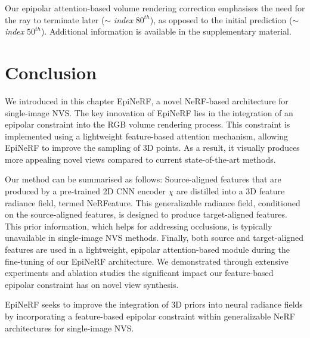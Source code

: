 Our epipolar attention-based volume rendering correction emphasises the need for the ray to terminate later ($\sim$ \textit{index} $80^{th}$), as opposed to the initial prediction ($\sim$ \textit{index} $50^{th}$). Additional information is available in the supplementary material.

\section{Conclusion}

We introduced in this chapter EpiNeRF, a novel \ac{NeRF}-based architecture for single-image \ac{NVS}. The key innovation of EpiNeRF lies in the integration of an epipolar constraint into the RGB volume rendering process. This constraint is implemented using a lightweight feature-based attention mechanism, allowing EpiNeRF to improve the sampling of 3D points. As a result, it visually produces more appealing novel views compared to current state-of-the-art methods.

Our method can be summarised as follows: Source-aligned features that are produced by a pre-trained 2D CNN encoder $\chi$ are distilled into a 3D feature radiance field, termed NeRFeature. This generalizable radiance field, conditioned on the source-aligned features, is designed to produce target-aligned features. This prior information, which helps for addressing occlusions, is typically unavailable in single-image \ac{NVS} methods. Finally, both source and target-aligned features are used in a lightweight, epipolar attention-based module during the fine-tuning of our EpiNeRF architecture. We demonstrated through extensive experiments and ablation studies the significant impact our feature-based epipolar constraint has on novel view synthesis.

EpiNeRF seeks to improve the integration of 3D priors into neural radiance fields by incorporating a feature-based epipolar constraint within generalizable NeRF architectures for single-image \ac{NVS}.
